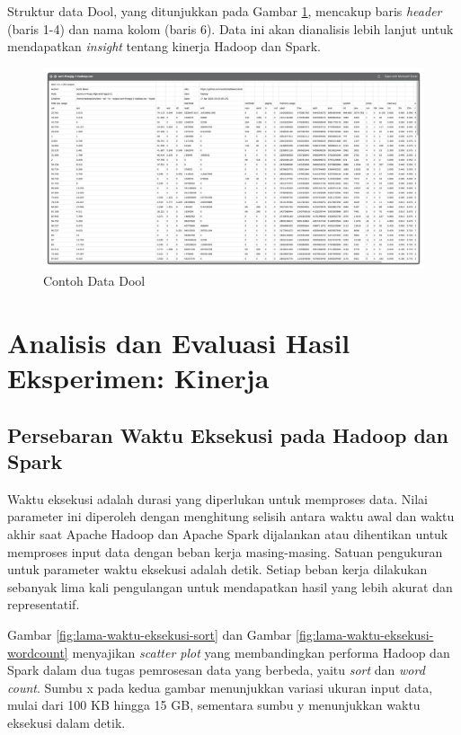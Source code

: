 Struktur data Dool, yang ditunjukkan pada Gambar \ref{fig:data-dool-dalam}, mencakup baris \textit{header} (baris 1-4) dan nama kolom (baris 6). Data ini akan dianalisis lebih lanjut untuk mendapatkan \textit{insight} tentang kinerja Hadoop dan Spark.

\begin{landscape}
\begin{figure}[h]
    \centering
    \includegraphics[width=\linewidth, height=0.5\linewidth]{figures/ch04/data-dool-dalam}
    \caption{Contoh Data Dool}
    \label{fig:data-dool-dalam}
\end{figure}
\end{landscape}

\newpage
\section {Analisis dan Evaluasi Hasil Eksperimen: Kinerja}
\subsection{Persebaran Waktu Eksekusi pada Hadoop dan Spark}
Waktu eksekusi adalah durasi yang diperlukan untuk memproses data. Nilai parameter ini diperoleh dengan menghitung selisih antara waktu awal dan waktu akhir saat Apache Hadoop dan Apache Spark dijalankan atau dihentikan untuk memproses input data dengan beban kerja masing-masing. Satuan pengukuran untuk parameter waktu eksekusi adalah detik. Setiap beban kerja dilakukan sebanyak lima kali pengulangan untuk mendapatkan hasil yang lebih akurat dan representatif.

Gambar \ref{fig:lama-waktu-eksekusi-sort} dan Gambar \ref{fig:lama-waktu-eksekusi-wordcount} menyajikan \textit{scatter plot} yang membandingkan performa Hadoop dan Spark dalam dua tugas pemrosesan data yang berbeda, yaitu \textit{sort} dan \textit{word count}. Sumbu x pada kedua gambar menunjukkan variasi ukuran input data, mulai dari 100 KB hingga 15 GB, sementara sumbu y menunjukkan waktu eksekusi dalam detik.

